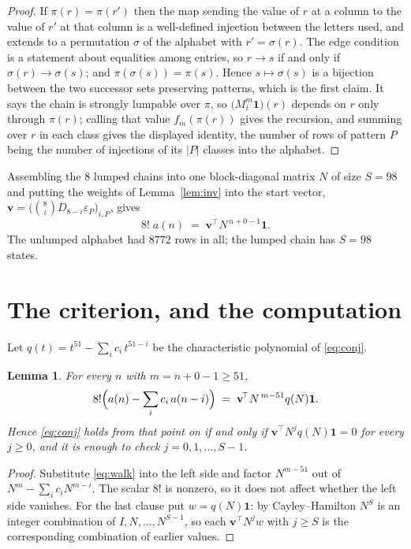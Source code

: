 \documentclass[11pt,a4paper]{article}
\theoremstyle{plain}
\newtheorem{lemma}[theorem]{Lemma}
\theoremstyle{definition}
\begin{document}
\begin{proof}
If $\pi(r)=\pi(r')$ then the map sending the value of $r$ at a column to the value of $r'$
at that column is a well-defined injection between the letters used, and extends to a
permutation $\sigma$ of the alphabet with $r'=\sigma(r)$. The edge condition is a statement
about equalities among entries, so $r\to s$ if and only if $\sigma(r)\to\sigma(s)$; and
$\pi(\sigma(s))=\pi(s)$. Hence $s\mapsto\sigma(s)$ is a bijection between the two successor
sets preserving patterns, which is the first claim. It says the chain is strongly lumpable
over $\pi$, so $\bigl(M_i^{m}\mathbf{1}\bigr)(r)$ depends on $r$ only through $\pi(r)$;
calling that value $f_m(\pi(r))$ gives the recursion, and summing over $r$ in each class
gives the displayed identity, the number of rows of pattern $P$ being the number of
injections of its $|P|$ classes into the alphabet.
\end{proof}

Assembling the $8$ lumped chains into one block-diagonal matrix $N$ of size $S=98$ and
putting the weights of Lemma~\ref{lem:inv} into the start vector,
$\mathbf{v}=\bigl(\binom{8}{i}D_{8-i}\varepsilon_P\bigr)_{i,P}$, gives
\begin{equation}\label{eq:walk}
8!\;a(n)\;=\;\mathbf{v}^{\!\top}N^{\,n+0-1}\mathbf{1} .
\end{equation}
The unlumped alphabet had $8772$ rows in all; the lumped chain has $S=98$ states.

\section{The criterion, and the computation}

Let $q(t)=t^{51}-\sum_i c_i\,t^{51-i}$ be the characteristic polynomial of
\eqref{eq:conj}.

\begin{lemma}\label{lem:crit}
For every $n$ with $m=n+0-1\ge51$,
\[
8!\Bigl(a(n)-\sum_i c_i\,a(n-i)\Bigr)\;=\;\mathbf{v}^{\!\top}N^{\,m-51}q(N)\mathbf{1} .
\]
Hence \eqref{eq:conj} holds from that point on if and only if
$\mathbf{v}^{\!\top}N^{j}q(N)\mathbf{1}=0$ for every $j\ge0$, and it is enough to check
$j=0,1,\dots,S-1$.
\end{lemma}

\begin{proof}
Substitute \eqref{eq:walk} into the left side and factor $N^{m-51}$ out of
$N^{m}-\sum_i c_iN^{m-i}$. The scalar $8!$ is nonzero, so it does not affect whether
the left side vanishes. For the last clause put $w=q(N)\mathbf{1}$: by Cayley--Hamilton
$N^{S}$ is an integer combination of $I,N,\dots,N^{S-1}$, so each
$\mathbf{v}^{\!\top}N^{j}w$ with $j\ge S$ is the corresponding combination of earlier
values.
\end{proof}
\end{document}
